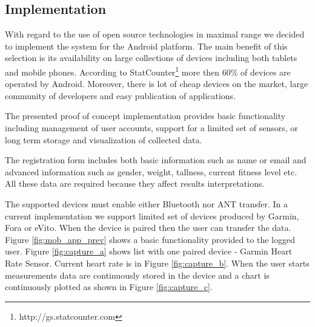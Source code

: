 \documentclass[a4paper,twoside]{article}
\begin{document}
\subsection{Implementation}

With regard to the use of open source technologies in maximal range we decided to implement the system for the Android platform. The main benefit of this selection is its availability on large collections of devices including both tablets and mobile phones. According to StatCounter\footnote{http://gs.statcounter.com} more then 60\% of devices are operated by Android.   Moreover, there is lot of cheap devices on the market, large community of developers and easy publication of applications. 

The presented proof of concept implementation provides basic functionality including management of user accounts,  support for a limited set of sensors, or long term storage and visualization of collected data.

The registration form includes both basic information such as name or email and advanced information such as gender, weight, tallness, current fitness level etc. All these data are required because they affect results interpretations.

The supported devices must enable either Bluetooth nor ANT transfer. In a current implementation we support limited set of devices produced by Garmin, Fora or eVito.  When the device is paired then the user can transfer the data. Figure \ref{fig:mob_app_prev} shows a basic functionality provided to the logged user. Figure \ref{fig:capture_a} shows list with one paired device - Garmin Heart Rate Sensor. Current heart rate is in Figure \ref{fig:capture_b}. When the user starts measurements data are continuously stored in the device and a chart is continuously plotted as shown in Figure \ref{fig:capture_c}.
\end{document}
